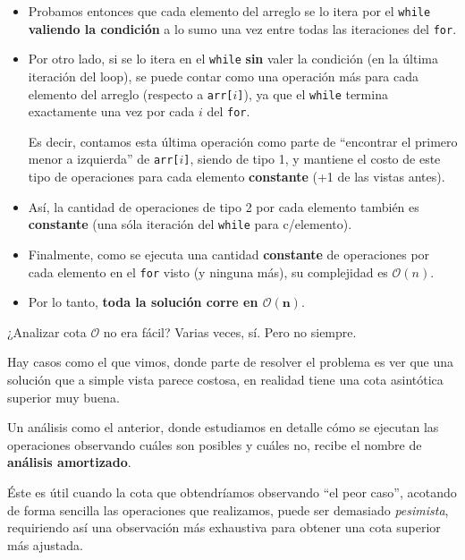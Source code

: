 \documentclass{beamer}
\begin{document}
    \begin{frame}[noframenumbering]
        \begingroup
        \setlength{\leftmargini}{12pt}
        \begin{itemize}
            \item Probamos entonces que cada elemento del arreglo se lo itera por el \texttt{while} \textbf{valiendo la condición} a lo sumo una vez entre todas las iteraciones del \texttt{for}.\pause 

            \item Por otro lado, si se lo itera en el \texttt{while} \textbf{sin} valer la condición (en la última iteración del loop), se puede contar como una operación más para cada elemento del arreglo (respecto a \texttt{arr[$i$]}), ya que el \texttt{while} termina exactamente una vez por cada $i$ del \texttt{for}. \pause

        Es decir, contamos esta última operación como parte de ``encontrar el primero menor a izquierda'' de \texttt{arr[$i$]}, siendo de tipo 1, y mantiene el costo de este tipo de operaciones para cada elemento \textbf{constante} (+1 de las vistas antes). \pause

            \item Así, la cantidad de operaciones de tipo 2 por cada elemento también es \textbf{constante} (una sóla iteración del \texttt{while} para c/elemento). \pause

            \item Finalmente, como se ejecuta una cantidad \textbf{constante} de operaciones por cada elemento en el \texttt{for} visto (y ninguna más), su complejidad es $\mathcal{O}(n)$. \pause

            \item Por lo tanto, \textbf{toda la solución corre en $\bm{\mathcal{O}(n)}$}.
        \end{itemize}
        \endgroup
    \end{frame}

    \begin{frame}{¿Analizar cota $\mathcal{O}$ no era fácil?}
        Varias veces, sí. Pero no siempre. \pause \vspace{4pt}

        Hay casos como el que vimos, donde parte de resolver el problema es ver que una solución que a simple vista parece costosa, en realidad tiene una cota asintótica superior muy buena. \pause \vspace{4pt}

        Un análisis como el anterior, donde estudiamos en detalle cómo se ejecutan las operaciones observando cuáles son posibles y cuáles no, recibe el nombre de \textbf{análisis amortizado}. \pause 

        Éste es útil cuando la cota que obtendríamos observando ``el peor caso'', acotando de forma sencilla las operaciones que realizamos, puede ser demasiado \textit{pesimista}, requiriendo así una observación más exhaustiva para obtener una cota superior más ajustada.
    \end{frame}
\end{document}
